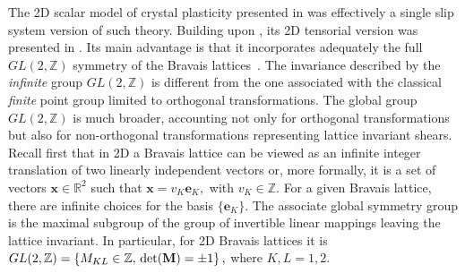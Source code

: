 \documentclass[CRPHYS,Unicode,manuscript]{cedram}
\begin{document}
The 2D scalar model  of crystal  plasticity  presented in \cite{Salman2011-ij,Salman2012-oa}  was effectively a single slip system  version  of such theory.  Building upon \cite{Conti2004-sv},  its  2D  tensorial version was presented in \cite{Baggio2019-rs}. Its main advantage is that it   incorporates   adequately the full   $GL(2,\mathbb Z)$  symmetry of the Bravais lattices~\cite{Ericksen1970-rx,Ericksen1980-km}. The invariance described by the \emph{infinite} group $GL(2,\mathbb Z)$ is different from the  one associated with the classical \emph{finite}  point group  limited to orthogonal transformations.  The global group $ GL(2,\mathbb{Z})$ is much broader,  accounting not only  for orthogonal transformations but also for non-orthogonal transformations representing  lattice invariant shears.                   
Recall first that in 2D  a   Bravais lattice  can be viewed as an  infinite integer translation of two linearly independent vectors or,  more formally, it is a set of vectors   $\mathbf{x}\in\mathbb{R}^2$ such that $ \mathbf{x}=
v_K{\mathbf{e}}_K,$ with $ v_K\in{\mathbb Z}.$
For a given Bravais lattice, there are infinite choices for the basis $\{\mathbf{e}_K\}$.  The associate global symmetry group is the maximal subgroup of the group  of invertible linear mappings  leaving the  lattice invariant. In particular, for  2D Bravais lattices it is  $GL(2,\mathbb{Z}) = \left\{
M_{KL}\in{\mathbb Z},\, {\det(\bf M)}=\pm1 \right\},
$ where $K,L=1,2$.
\end{document}
